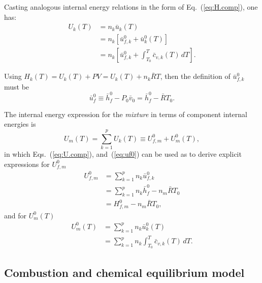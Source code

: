     Casting analogous internal energy relations in the form of Eq.~(\ref{eq:H.comp}), one has:%
    \begin{align}
        U_k(T)      &= n_k\bar{u}_k(T) \nonumber\\
                    &= n_k[\bar{u}^0_{f,k} + \bar{u}^0_k(T)] \nonumber\\
                    &= n_k\left[
                        \bar{u}^0_{f,k} + \int_{T_0}^T \bar{c}_{v,k}(T)\,dT
                    \right].
        \label{eq:U.comp}
    \end{align}

    Using $H_k(T) = U_k(T) + PV = U_k(T) + n_k\bar{R}T$, then the definition of $\bar{u}^0_{f,k}$ must be%
    \begin{equation}
        \bar{u}_f^0 \equiv \bar{h}_f^0 - P_0\bar{v}_0 = \bar{h}_f^0 - \bar{R}T_0.
        \label{eq:uf0}
    \end{equation}

    The internal energy expression for the \emph{mixture} in terms of component internal energies is%
    \begin{equation}
        U_m(T) = \sum_{k=1}^p U_k(T) \equiv U^0_{f,m} + U^0_m(T),
        \label{eq:U.mix}
    \end{equation}
    \noindent in which Eqs.~(\ref{eq:U.comp}), and~(\ref{eq:uf0}) can be used as to derive explicit expressions for $U^0_{f,m}$%
    \begin{align}
        U^0_{f,m}   &= \sum_{k=1}^p n_k\bar{u}^0_{f,k} \nonumber\\
                    &= \sum_{k=1}^p n_k\bar{h}_f^0 - n_m\bar{R}T_0 \nonumber\\
                    &= H^0_{f,m} - n_m\bar{R}T_0,
        \label{eq:Uf0.mix}
    \end{align}
    \noindent and for $U^0_m(T)$%
    \begin{align}
        U^0_m(T)    &= \sum_{k=1}^p n_k\bar{u}^0_k(T) \nonumber\\
                    &= \sum_{k=1}^p n_k \int_{T_0}^T \bar{c}_{v,k}(T)\,dT.
        \label{eq:U0.mix}
    \end{align}


    \subsection{Combustion and chemical equilibrium model}\label{sec:model.cchemm}

